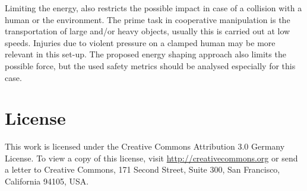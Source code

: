 \documentclass[a4paper,twoside, openright,12pt]{report}
\begin{document}
Limiting the energy, also restricts the possible impact in case of a collision with a human or the environment. The prime task in cooperative manipulation is the transportation of large and/or heavy objects, usually this is carried out at low speeds. Injuries due to violent pressure on a clamped human may be more relevant in this set-up. The proposed energy shaping approach also limits the possible force, but the used safety metrics should be analysed especially for this case.
%
%
%
%
%




\cleardoublepage
{} 
\listoffigures 	 %


\cleardoublepage
{}
{}



\cleardoublepage
\chapter*{License}
This work is licensed under the Creative Commons Attribution 3.0 Germany
License. To view a copy of this license,
visit \href{http://creativecommons.org/licenses/by/3.0/de/}{http://creativecommons.org} or send a letter
to Creative Commons, 171 Second Street, Suite 300, San
Francisco, California 94105, USA.
\end{document}
